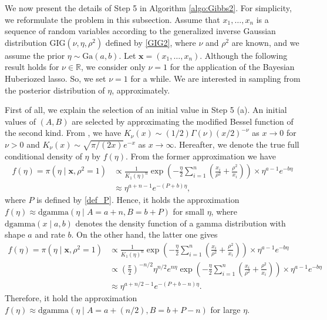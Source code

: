 \documentclass[11pt]{article}
\theoremstyle{plain}
\theoremstyle{definition}
\begin{document}
We now present the details of Step 5 in Algorithm \ref{algo:Gibbs2}. For simplicity, we reformulate the problem in this subsection. Assume that $x_1,\dots,x_n$ is a sequence of random variables according to the generalized inverse Gaussian distribution $\mathrm{GIG}(\nu,\eta,\rho^2)$ defined by \eqref{GIG2}, where $\nu$ and $\rho^2$ are known, and we assume the prior $\eta \sim \mathrm{Ga}(a,b)$. Let $\bm{x}=(x_1,\dots,x_n)$. Although the following result holds for $\nu \in \mathbb{R}$, we consider only $\nu=1$ for the application of the Bayesian Huberiozed lasso. So, we set $\nu=1$ for a while. We are interested in sampling from the posterior distribution of $\eta$, approximately. 

First of all, we explain the selection of an initial value in Step 5 (a). An initial values of $(A,B)$ are selected by approximating the modified Bessel function of the second kind. From \cite{AS65}, we have $K_{\nu}(x)\sim (1/2)\Gamma(\nu) (x/2)^{-\nu}$ as $x\to 0$ for $\nu>0$ and $K_{\nu}(x)\sim \sqrt{\pi/(2x)} e^{-x}$ as $x\to \infty$. Hereafter, we denote the true full conditional density of $\eta$ by $f(\eta)$. From the former approximation we have
\begin{align*}
f(\eta)=\pi(\eta\mid \bm{x},\rho^2=1)&\propto \frac{1}{K_1(\eta)^n} \exp \left(-\frac{\eta}{2} \sum_{i=1}^n \left(\frac{x_i}{\rho^2}+\frac{\rho^2}{x_i}\right)\right)\times \eta^{a-1}e^{-b\eta}\\
&\approx \eta^{a+n-1}e^{-(P+b)\eta},
\end{align*}
where $P$ is defined by \eqref{def_P}. Hence, it holds the approximation $f(\eta)\approx \mathrm{dgamma}(\eta\mid A=a+n,B=b+P)$ for small $\eta$, where $\mathrm{dgamma}(x\mid a,b)$ denotes the density function of a gamma distribution with shape $a$ and rate $b$. On the other hand, the latter one gives
\begin{align*}
f(\eta)=\pi(\eta\mid \bm{x},\rho^2=1)&\propto \frac{1}{K_1(\eta)^n} \exp \left(-\frac{\eta}{2} \sum_{i=1}^n \left(\frac{x_i}{\rho^2}+\frac{\rho^2}{x_i}\right)\right)\times \eta^{a-1}e^{-b\eta}\\
&\propto \left(\frac{\pi}{2}\right)^{-n/2}\eta^{n/2}e^{n\eta}\exp \left(-\frac{\eta}{2} \sum_{i=1}^n \left(\frac{x_i}{\rho^2}+\frac{\rho^2}{x_i}\right)\right)\times \eta^{a-1}e^{-b\eta}\\
&\approx \eta^{a+n/2-1}e^{-(P+b-n)\eta}.
\end{align*}
Therefore, it hold the approximation $f(\eta)\approx \mathrm{dgamma}\left(\eta\mid A=a+(n/2),B=b+P-n\right)$ for large $\eta$. 
\end{document}
